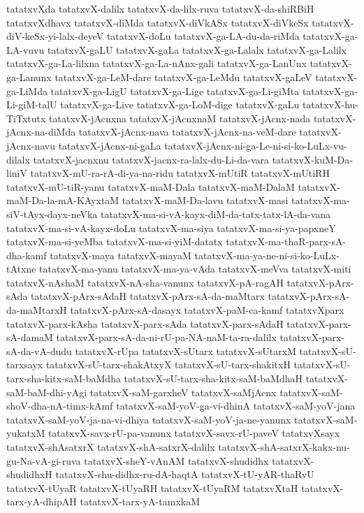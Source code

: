 {tatatxvXda
tatatxvX-dalilx
tatatxvX-da-lilx-ruva
tatatxvX-da-shiRBiH
tatatxvXdhavx
tatatxvX-diMda
tatatxvX-diVkASx
tatatxvX-diVkeSx
tatatxvX-diV-keSx-yi-lalx-deyeV
tatatxvX-doLu
tatatxvX-ga-LA-du-da-riMda
tatatxvX-ga-LA-vuvu
tatatxvX-gaLU
tatatxvX-gaLa
tatatxvX-ga-Lalalx
tatatxvX-ga-Lalilx
tatatxvX-ga-La-lilxna
tatatxvX-ga-La-nAnx-gali
tatatxvX-ga-LanUnx
tatatxvX-ga-Lanunx
tatatxvX-ga-LeM-dare
tatatxvX-ga-LeMdu
tatatxvX-gaLeV
tatatxvX-ga-LiMda
tatatxvX-ga-LigU
tatatxvX-ga-Lige
tatatxvX-ga-Li-giMta
tatatxvX-ga-Li-giM-talU
tatatxvX-ga-Live
tatatxvX-ga-LoM-dige
tatatxvX-gaLu
tatatxvX-hu-TiTxtutx
tatatxvX-jAcnxna
tatatxvX-jAcnxnaM
tatatxvX-jAcnx-nada
tatatxvX-jAcnx-na-diMda
tatatxvX-jAcnx-nava
tatatxvX-jAcnx-na-veM-dare
tatatxvX-jAcnx-navu
tatatxvX-jAcnx-ni-gaLa
tatatxvX-jAcnx-ni-ga-Le-ni-si-ko-LuLx-vu-dilalx
tatatxvX-jacnxnu
tatatxvX-jacnx-ra-lalx-du-Li-da-vara
tatatxvX-kuM-Da-liniV
tatatxvX-mU-ra-rA-di-ya-na-ridu
tatatxvX-mUtiR
tatatxvX-mUtiRH
tatatxvX-mU-tiR-yanu
tatatxvX-maM-Dala
tatatxvX-maM-DalaM
tatatxvX-maM-Da-la-mA-KAyxtaM
tatatxvX-maM-Da-lavu
tatatxvX-masi
tatatxvX-ma-siV-tAyx-dayx-neVka
tatatxvX-ma-si-vA-kayx-diM-da-tatx-tatx-lA-da-vana
tatatxvX-ma-si-vA-kayx-doLu
tatatxvX-ma-siya
tatatxvX-ma-si-ya-papxneY
tatatxvX-ma-si-yeMba
tatatxvX-ma-si-yiM-datatx
tatatxvX-ma-thaR-parx-sA-dha-kamf
tatatxvX-maya
tatatxvX-mayaM
tatatxvX-ma-ya-ne-ni-si-ko-LuLx-tAtxne
tatatxvX-ma-yanu
tatatxvX-ma-ya-vAda
tatatxvX-meVva
tatatxvX-miti
tatatxvX-nAshaM
tatatxvX-nA-sha-vanunx
tatatxvX-pA-ragAH
tatatxvX-pArx-sAda
tatatxvX-pArx-sAdaH
tatatxvX-pArx-sA-da-maMtarx
tatatxvX-pArx-sA-da-maMtarxH
tatatxvX-pArx-sA-dasayx
tatatxvX-paM-ca-kamf
tatatxvXparx
tatatxvX-parx-kAsha
tatatxvX-parx-sAda
tatatxvX-parx-sAdaH
tatatxvX-parx-sA-damaM
tatatxvX-parx-sA-da-ni-rU-pa-NA-naM-ta-ra-dalilx
tatatxvX-parx-sA-da-vA-dudu
tatatxvX-rUpa
tatatxvX-sUtarx
tatatxvX-sUtarxM
tatatxvX-sU-tarxsayx
tatatxvX-sU-tarx-shakAtxyX
tatatxvX-sU-tarx-shakitxH
tatatxvX-sU-tarx-sha-kitx-saM-baMdha
tatatxvX-sU-tarx-sha-kitx-saM-baMdhaH
tatatxvX-saM-baM-dhi-yAgi
tatatxvX-saM-garxheV
tatatxvX-saMjAcnx
tatatxvX-saM-shoV-dha-nA-timx-kAmf
tatatxvX-saM-yoV-ga-vi-dhinA
tatatxvX-saM-yoV-jana
tatatxvX-saM-yoV-ja-na-vi-dhiya
tatatxvX-saM-yoV-ja-ne-yanunx
tatatxvX-saM-yukatxM
tatatxvX-savx-rU-pa-vanunx
tatatxvX-savx-rU-paveV
tatatxvXsayx
tatatxvX-shAsatxrX
tatatxvX-shA-satxrX-dalilx
tatatxvX-shA-satxrX-kakx-nu-gu-Na-vA-gi-ruva
tatatxvX-sheY-vAnAM
tatatxvX-shudidhx
tatatxvX-shudidhxH
tatatxvX-shu-didhx-ru-dA-haqtA
tatatxvX-tU-yAR-thaRvU
tatatxvX-tUyaR
tatatxvX-tUyaRH
tatatxvX-tUyaRM
tatatxvXtaH
tatatxvX-tarx-yA-dhipAH
tatatxvX-tarx-yA-tamxkaM
}
